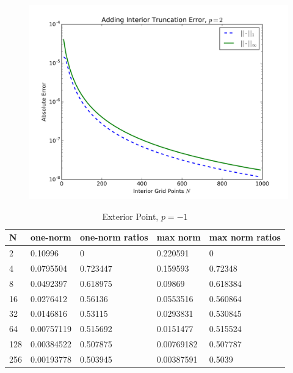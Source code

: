 \documentclass{article} %
\theoremstyle{plain}
\numberwithin{equation}{section} %
\numberwithin{figure}{section} %
\numberwithin{table}{section} %
\begin{document}
\begin{enumerate}[\ \ (a)]
\begin{figure}[ht!]
\begin{minipage}[b]{0.5\linewidth}
                \centering
                \includegraphics[width=\linewidth]{figure_2c1_int_p=2.png}
                \vspace{4ex}
            \end{minipage} 
        \end{figure}
        \FloatBarrier
        \begin{table}
            \centering
            \caption{Exterior Point, $p=-1$}
            \begin{tabular}[ht!]{lllll}
                \hline
                    N &    one-norm &   one-norm ratios &    max norm &   max norm ratios \\
                \hline
                    2 & 0.10996     &          0        & 0.220591    &          0        \\
                    4 & 0.0795504   &          0.723447 & 0.159593    &          0.72348  \\
                    8 & 0.0492397   &          0.618975 & 0.09869     &          0.618384 \\
                   16 & 0.0276412   &          0.56136  & 0.0553516   &          0.560864 \\
                   32 & 0.0146816   &          0.53115  & 0.0293831   &          0.530845 \\
                   64 & 0.00757119  &          0.515692 & 0.0151477   &          0.515524 \\
                  128 & 0.00384522  &          0.507875 & 0.00769182  &          0.507787 \\
                  256 & 0.00193778  &          0.503945 & 0.00387591  &          0.5039   \\

\end{tabular}
\end{table}
\end{enumerate}
\end{document}
